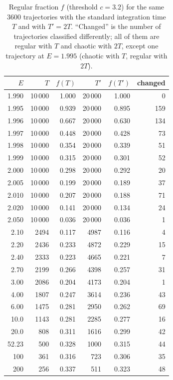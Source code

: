 \documentclass[11pt,a4paper]{article}
\begin{document}
\begin{table}[H]
\centering
\caption{Regular fraction $f$ (threshold $c=3.2$) for the same $3600$
trajectories with the standard integration time $T$ and with $T'=2T$.
``Changed'' is the number of trajectories classified differently; all of them
are regular with $T$ and chaotic with $2T$, except one trajectory at
$E=1.995$ (chaotic with $T$, regular with $2T$).}
\label{tab:convergence}
\begin{tabular}{@{}rrrrrr@{}}
\toprule
$E$ & $T$ & $f(T)$ & $T'$ & $f(T')$ & changed\\
\midrule
1.990 & 10\,000 & 1.000 & 20\,000 & 1.000 & 0\\
1.995 & 10\,000 & 0.939 & 20\,000 & 0.895 & 159\\
1.996 & 10\,000 & 0.667 & 20\,000 & 0.630 & 134\\
1.997 & 10\,000 & 0.448 & 20\,000 & 0.428 & 73\\
1.998 & 10\,000 & 0.354 & 20\,000 & 0.339 & 51\\
1.999 & 10\,000 & 0.315 & 20\,000 & 0.301 & 52\\
2.000 & 10\,000 & 0.298 & 20\,000 & 0.292 & 20\\
2.005 & 10\,000 & 0.199 & 20\,000 & 0.189 & 37\\
2.010 & 10\,000 & 0.207 & 20\,000 & 0.188 & 71\\
2.020 & 10\,000 & 0.141 & 20\,000 & 0.134 & 24\\
2.050 & 10\,000 & 0.036 & 20\,000 & 0.036 & 1\\
\midrule
2.10  & 2494 & 0.117 & 4987 & 0.116 & 4\\
2.20  & 2436 & 0.233 & 4872 & 0.229 & 15\\
2.40  & 2333 & 0.223 & 4665 & 0.221 & 7\\
2.70  & 2199 & 0.266 & 4398 & 0.257 & 31\\
3.00  & 2086 & 0.204 & 4173 & 0.204 & 1\\
4.00  & 1807 & 0.247 & 3614 & 0.236 & 43\\
6.00  & 1475 & 0.281 & 2950 & 0.262 & 69\\
10.0  & 1143 & 0.281 & 2285 & 0.277 & 16\\
20.0  & 808  & 0.311 & 1616 & 0.299 & 42\\
52.23 & 500  & 0.328 & 1000 & 0.315 & 44\\
100   & 361  & 0.316 & 723  & 0.306 & 35\\
200   & 256  & 0.337 & 511  & 0.323 & 48\\
\bottomrule
\end{tabular}
\end{table}
\end{document}

